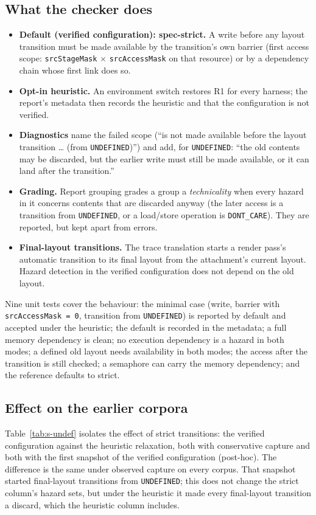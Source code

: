 \documentclass[acmtog,anonymous,review]{acmart}
\newcommand{\code}[1]{\texttt{#1}}
\begin{document}
\subsection{What the checker does}
\begin{itemize}
\item \textbf{Default (verified configuration): spec-strict.} A write before any layout transition must be made
  available by the transition's own barrier (first access scope: \code{srcStageMask} $\times$ \code{srcAccessMask} on
  that resource) or by a dependency chain whose first link does so.
\item \textbf{Opt-in heuristic.} An environment switch restores R1 for every harness; the report's metadata then
  records the heuristic and that the configuration is not verified.
\item \textbf{Diagnostics} name the failed scope (``is not made available before the layout transition \dots{} (from
  \code{UNDEFINED})'') and add, for \code{UNDEFINED}: ``the old contents may be discarded, but the earlier write must
  still be made available, or it can land after the transition.''
\item \textbf{Grading.} Report grouping grades a group a \emph{technicality} when every hazard in it concerns contents
  that are discarded anyway (the later access is a transition from \code{UNDEFINED}, or a load/store operation is
  \code{DONT\_CARE}). They are reported, but kept apart from errors.
\item \textbf{Final-layout transitions.} The trace translation starts a render pass's automatic transition to its
  final layout from the attachment's current layout. Hazard detection in the verified configuration does not depend
  on the old layout.
\end{itemize}
Nine unit tests cover the behaviour: the minimal case (write, barrier with \code{srcAccessMask = 0}, transition from
\code{UNDEFINED}) is reported by default and accepted under the heuristic; the default is recorded in the metadata; a
full memory dependency is clean; no execution dependency is a hazard in both modes; a defined old layout needs
availability in both modes; the access after the transition is still checked; a semaphore can carry the memory
dependency; and the reference defaults to strict.

\subsection{Effect on the earlier corpora}
Table~\ref{tab:s-undef} isolates the effect of strict transitions: the verified configuration against the heuristic
relaxation, both with conservative capture and both with the first snapshot of the verified configuration (post-hoc).
The difference is the same under observed capture on every corpus. That snapshot started final-layout transitions
from \code{UNDEFINED}; this does not change the strict column's hazard sets, but under the heuristic it made every
final-layout transition a discard, which the heuristic column includes.
\end{document}
